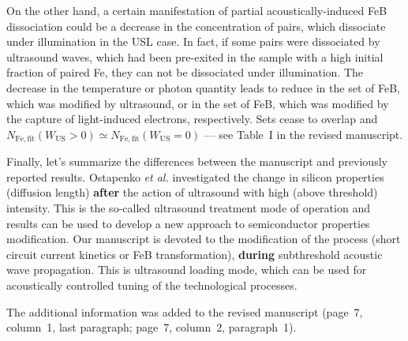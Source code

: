 \documentclass[sn-mathphys]{sn-jnl}
\begin{document}
On the other hand, a certain manifestation of partial acoustically-induced FeB dissociation could be
a decrease in the concentration of pairs, which dissociate under illumination in the USL case.
In fact, if some pairs were dissociated by  ultrasound waves, which had been pre-exited
in the sample with a high initial  fraction of paired Fe,
they can not be dissociated under illumination.
The decrease in the temperature   or photon quantity leads to reduce in the set of FeB, which was modified by ultrasound, or in the set of FeB,
which was modified by the capture of light-induced electrons, respectively.
Sets cease to overlap and $N_\mathrm{Fe,fit}(W_\mathrm{US}>0)\simeq N_\mathrm{Fe,fit}(W_\mathrm{US}=0)$ --- see Table~I in the revised manuscript.


Finally, let's summarize the differences between the manuscript and previously reported results.
Ostapenko \emph{et al.}\cite{Ostapenko1995,Ostapenko1994APL,Ostapenko1995SST}
investigated the change in silicon properties (diffusion length) \textbf{after}
the action of ultrasound with high (above threshold) intensity.
This is the so-called ultrasound treatment mode of operation
and results  can be used to develop a new approach to semiconductor properties modification.
Our manuscript is devoted to the modification of the process
(short circuit current kinetics or FeB transformation),
\textbf{during} subthreshold acoustic wave propagation.
This is ultrasound loading mode,
which can be used for acoustically controlled tuning of the technological processes.

The additional information was added to the revised manuscript
(page~7, column~1, last paragraph; page~7, column~2, paragraph~1).


\end{document}
